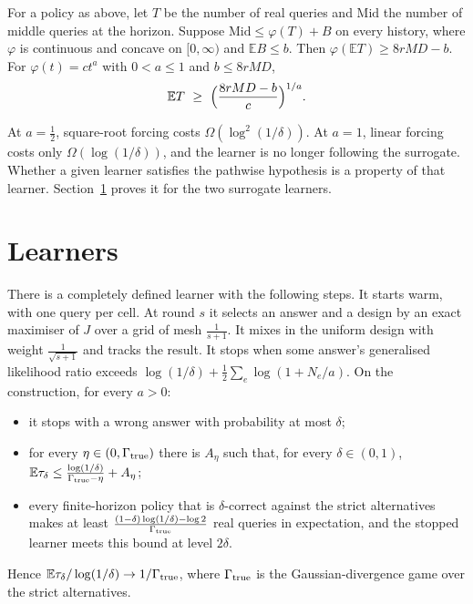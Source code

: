 \begin{theorem}
\label{thm:forcing}
For a policy as above, let $T$ be the number of real queries and $\mathrm{Mid}$ the number of
middle queries at the horizon. Suppose $\mathrm{Mid}\le\varphi(T)+B$ on every history, where
$\varphi$ is continuous and concave on $[0,\infty)$ and $\mathbb{E}B\le b$. Then
$\varphi(\mathbb{E}T)\ge8rMD-b$. For $\varphi(t)=ct^{a}$ with $0<a\le1$ and
$b\le 8rMD$,
\[
\mathbb{E}T\ \ge\ \Bigl(\frac{8rMD-b}{c}\Bigr)^{1/a}.
\]
\end{theorem}


At $a=\frac12$, square-root forcing costs $\Omega(\log^{2}(1/\delta))$. At $a=1$, linear
forcing costs only $\Omega(\log(1/\delta))$, and the learner is no longer following the
surrogate. Whether a given learner satisfies the pathwise hypothesis is a property of that
learner. Section~\ref{sec:learners} proves it for the two surrogate learners.

\section{Learners}
\label{sec:learners}

\begin{theorem}
\label{thm:ideal}
There is a completely defined learner with the following steps. It starts warm, with one query
per cell. At round $s$ it selects an answer and a design by an exact maximiser of $J$ over a
grid of mesh $\frac{1}{s+1}$. It mixes in the uniform design with weight
$\frac{1}{\sqrt{s+1}}$ and tracks the result. It stops when some answer's generalised
likelihood ratio exceeds $\log(1/\delta)+\frac12\sum_{e}\log(1+N_{e}/a)$. On the construction,
for every $a>0$:
\begin{itemize}
\item it stops with a wrong answer with probability at most $\delta$;
\item for every $\eta\in(0,\Gamma_{\rm true})$ there is $A_{\eta}$ such that, for every
$\delta\in(0,1)$, $\mathbb{E}\tau_{\delta}\le\frac{\log(1/\delta)}{\Gamma_{\rm true}-\eta}+A_{\eta}$;
\item every finite-horizon policy that is $\delta$-correct against the strict alternatives
makes at least $\frac{(1-\delta)\log(1/\delta)-\log2}{\Gamma_{\rm true}}$ real queries in
expectation, and the stopped learner meets this bound at level $2\delta$.
\end{itemize}
Hence $\mathbb{E}\tau_{\delta}/\log(1/\delta)\to1/\Gamma_{\rm true}$, where $\Gamma_{\rm true}$ is
the Gaussian-divergence game over the strict alternatives.
\end{theorem}

